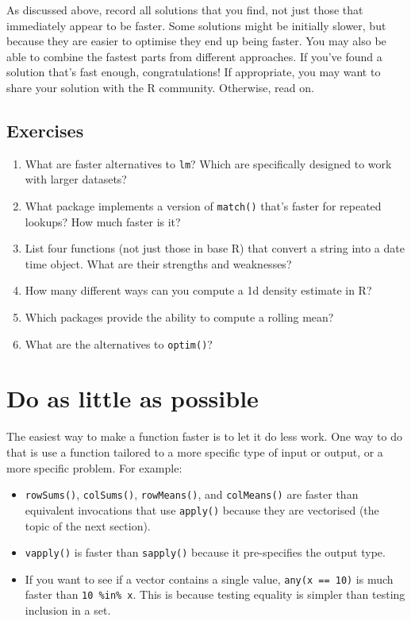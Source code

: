 As discussed above, record all solutions that you find, not just those
that immediately appear to be faster. Some solutions might be initially
slower, but because they are easier to optimise they end up being
faster. You may also be able to combine the fastest parts from different
approaches. If you've found a solution that's fast enough,
congratulations! If appropriate, you may want to share your solution
with the R community. Otherwise, read on.

\hypertarget{exercises}{%
\subsection{Exercises}\label{exercises}}

\begin{enumerate}
\def\labelenumi{\arabic{enumi}.}
\item
  What are faster alternatives to \texttt{lm}? Which are specifically
  designed to work with larger datasets?
\item
  What package implements a version of \texttt{match()} that's faster
  for repeated lookups? How much faster is it?
\item
  List four functions (not just those in base R) that convert a string
  into a date time object. What are their strengths and weaknesses?
\item
  How many different ways can you compute a 1d density estimate in R?
\item
  Which packages provide the ability to compute a rolling mean?
\item
  What are the alternatives to \texttt{optim()}?
\end{enumerate}

\hypertarget{be-lazy}{%
\section{Do as little as possible}\label{be-lazy}}

The easiest way to make a function faster is to let it do less work. One
way to do that is use a function tailored to a more specific type of
input or output, or a more specific problem. For example:

\begin{itemize}
\item
  \texttt{rowSums()}, \texttt{colSums()}, \texttt{rowMeans()}, and
  \texttt{colMeans()} are faster than equivalent invocations that use
  \texttt{apply()} because they are vectorised (the topic of the next
  section).
\item
  \texttt{vapply()} is faster than \texttt{sapply()} because it
  pre-specifies the output type.
\item
  If you want to see if a vector contains a single value,
  \texttt{any(x\ ==\ 10)} is much faster than \texttt{10\ \%in\%\ x}.
  This is because testing equality is simpler than testing inclusion in
  a set.
\end{itemize}

